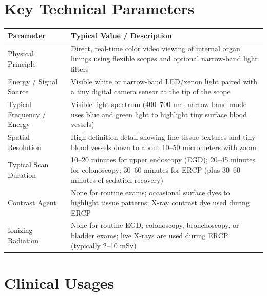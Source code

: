 \section{Key Technical Parameters}
\noindent
\begin{tabularx}{\textwidth}{@{}l X@{}}
\toprule
\textbf{Parameter} & \textbf{Typical Value / Description} \\
\midrule
Physical Principle & Direct, real-time color video viewing of internal organ linings using flexible scopes and optional narrow-band light filters \\
Energy / Signal Source & Visible white or narrow-band LED/xenon light paired with a tiny digital camera sensor at the tip of the scope \\
Typical Frequency / Energy & Visible light spectrum (400--700 nm; narrow-band mode uses blue and green light to highlight tiny surface blood vessels) \\
Spatial Resolution & High-definition detail showing fine tissue textures and tiny blood vessels down to about 10--50 micrometers with zoom \\
Typical Scan Duration & 10--20 minutes for upper endoscopy (EGD); 20--45 minutes for colonoscopy; 30--60 minutes for ERCP (plus 30--60 minutes of sedation recovery) \\
Contrast Agent & None for routine exams; occasional surface dyes to highlight tissue patterns; X-ray contrast dye used during ERCP \\
Ionizing Radiation & None for routine EGD, colonoscopy, bronchoscopy, or bladder exams; live X-rays are used during ERCP (typically 2--10 mSv) \\
\bottomrule
\end{tabularx}


\section{Clinical Usages}

